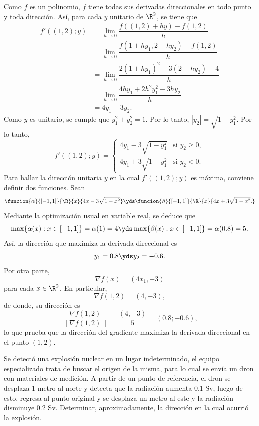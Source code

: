 \documentclass[a4,11pt]{aleph-examen}
\begin{document}
\begin{preguntas}
\begin{respuesta}
\begin{respuesta}
\begin{respuesta}
	Como $f$ es un polinomio, $f$ tiene todas sus derivadas direccionales en todo punto y toda dirección. Así, para cada $y$ unitario de $\R^2$, se tiene que
	\begin{align*}
		f'((1,2);y)
			&=\lim_{h\to 0}\dfrac{f((1,2)+hy)-f(1,2)}{h}    \\
			&=\lim_{h\to 0}\dfrac{f(1+hy_1,2+hy_2)-f(1,2)}{h}\\	
			&=\lim_{h\to 0}\dfrac{2(1+hy_1)^2-3(2+hy_2)+4}{h}    \\
	        &=\lim_{h\to 0}\dfrac{4hy_1+2h^2y_1^2-3hy_2}{h}    \\
			&=4y_1-3y_2.
	\end{align*}
    Como $y$ es unitario, se cumple que $y_1^2+y_2^2=1$. Por lo tanto, $|y_2|=\sqrt{1-y_1^2}$. Por lo tanto,
    \[
        f'((1,2);y)
        =\begin{cases}
            4y_1-3\sqrt{1-y_1^2}& \text{si }y_2\geq0,\\
            4y_1+3\sqrt{1-y_1^2}& \text{si }y_2<0.
        \end{cases}
    \]
    Para hallar la dirección unitaria $y$ en la cual $f'((1,2);y)$ es máxima, conviene definir dos funciones. Sean
    \[
        \funcion{\alpha}{[-1,1]}{\R}{x}{4x-3\sqrt{1-x^2}}
        \yds
        \funcion{\beta}{[-1,1]}{\R}{x}{4x+3\sqrt{1-x^2}.}
    \]
    Mediante la optimización usual en variable real, se deduce que
    \[
        \max\{\alpha(x):x\in[-1,1]\}=\alpha(1)=4
        \yds
        \max\{\beta(x):x\in[-1,1]\}=\alpha(0.8)=5.
    \]
    Así, la dirección que maximiza la derivada direccional es
    \[
        y_1=0.8
        \yds
        y_2=-0.6.
    \]
    Por otra parte,
    \[
        \nabla f(x)=(4x_1,-3)
    \]
    para cada $x\in\R^2$. En particular,
    \[
        \nabla f(1,2)=(4,-3),
    \]
    de donde, su dirección es
    \[
        \dfrac{\nabla f(1,2)}{\|\nabla f(1,2)\|}
        =\dfrac{(4,-3)}{5}
        =(0.8;-0.6),
    \]
	lo que prueba que la dirección del gradiente maximiza la derivada direccional en el punto $(1,2)$.
\end{respuesta}

\item
    Se detectó una explosión nuclear en un lugar indeterminado, el equipo especializado trata de buscar el origen de la misma, para lo cual se envía un dron con materiales de medición. A partir de un punto de referencia, el dron se desplaza 1 metro al norte y detecta que la radiación aumenta 0.1 Sv, luego de esto, regresa al punto original y se desplaza un metro al este y la radiación disminuye 0.2 Sv. Determinar, aproximadamente, la dirección en la cual ocurrió la explosión.


\end{respuesta}
\end{respuesta}
\end{preguntas}
\end{document}
